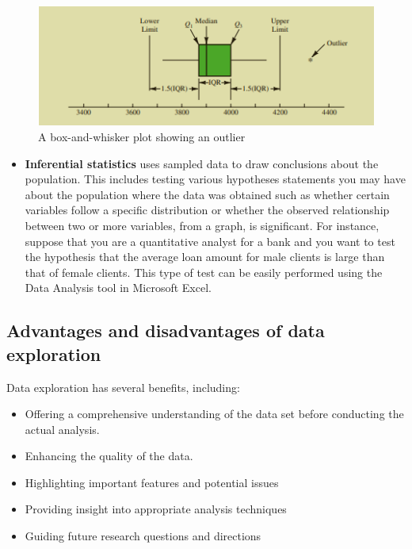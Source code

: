 \documentclass[
]{book}
\providecommand{\tightlist}{%
  \setlength{\itemsep}{0pt}\setlength{\parskip}{0pt}}
\begin{document}
\begin{figure}

{\centering \includegraphics[width=0.8\linewidth]{Figures-Chapter1/Outlier} 

}

\caption{A box-and-whisker plot showing an outlier}\label{fig:unnamed-chunk-1}
\end{figure}

\begin{itemize}
\tightlist
\item
  \textbf{Inferential statistics} uses sampled data to draw conclusions about the population. This includes testing various hypotheses statements you may have about the population where the data was obtained such as whether certain variables follow a specific distribution or whether the observed relationship between two or more variables, from a graph, is significant. For instance, suppose that you are a quantitative analyst for a bank and you want to test the hypothesis that the average loan amount for male clients is large than that of female clients. This type of test can be easily performed using the Data Analysis tool in Microsoft Excel.
\end{itemize}

\subsection{Advantages and disadvantages of data exploration}\label{advantages-and-disadvantages-of-data-exploration}

Data exploration has several benefits, including:

\begin{itemize}
\item
  Offering a comprehensive understanding of the data set before conducting the actual analysis.
\item
  Enhancing the quality of the data.
\item
  Highlighting important features and potential issues
\item
  Providing insight into appropriate analysis techniques~
\item
  Guiding future research questions and directions
\end{itemize}
\end{document}
